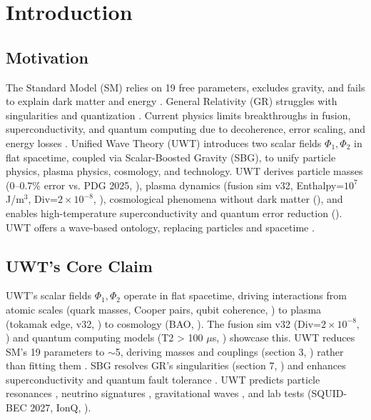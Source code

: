 \section{Introduction}
\subsection{Motivation}
The Standard Model (SM) relies on 19 free parameters, excludes gravity, and fails to explain dark matter and energy \citep{Planck2020}. General Relativity (GR) struggles with singularities and quantization \citep{Hawking1970}. Current physics limits breakthroughs in fusion, superconductivity, and quantum computing due to decoherence, error scaling, and energy losses \citep{Fowler2012}. Unified Wave Theory (UWT) introduces two scalar fields \(\Phi_1, \Phi_2\) in flat spacetime, coupled via Scalar-Boosted Gravity (SBG), to unify particle physics, plasma physics, cosmology, and technology. UWT derives particle masses (0--0.7\% error vs. PDG 2025, \citealp{Baldwin2025Masses}), plasma dynamics (fusion sim v32, Enthalpy=$10^7$ J/m\(^3\), Div=$2 \times 10^{-8}$, \citealp{Baldwin2025Fusion}), cosmological phenomena without dark matter (\citealp{Baldwin2025Cosmo,Baldwin2025Bullet,Baldwin2025Baryo}), and enables high-temperature superconductivity and quantum error reduction (\citealp{Baldwin2025Quantum}). UWT offers a wave-based ontology, replacing particles and spacetime \citep{Bohm1952}.

\subsection{UWT’s Core Claim}
UWT’s scalar fields \(\Phi_1, \Phi_2\) operate in flat spacetime, driving interactions from atomic scales (quark masses, Cooper pairs, qubit coherence, \citealp{Baldwin2025Masses,Baldwin2025Quantum}) to plasma (tokamak edge, v32, \citealp{Baldwin2025Fusion}) to cosmology (BAO, \citealp{Baldwin2025Cosmo}). The fusion sim v32 (Div=$2 \times 10^{-8}$, \citealp{Baldwin2025Fusion}) and quantum computing models (T2 > 100 \(\mu\)s, \citealp{Baldwin2025Quantum}) showcase this. UWT reduces SM’s 19 parameters to $\sim$5, deriving masses and couplings (section 3, \citealp{Baldwin2025Masses}) rather than fitting them \citep{Weinberg1967}. SBG resolves GR’s singularities (section 7, \citealp{Baldwin2025BlackHoles}) and enhances superconductivity and quantum fault tolerance \citep{Cooper1957,Fowler2012}. UWT predicts particle resonances \citep{Aad2024}, neutrino signatures \citep{Abi2020}, gravitational waves \citep{Amaro-Seoane2023}, and lab tests (SQUID-BEC 2027, IonQ, \citealp{Baldwin2025Quantum}).

